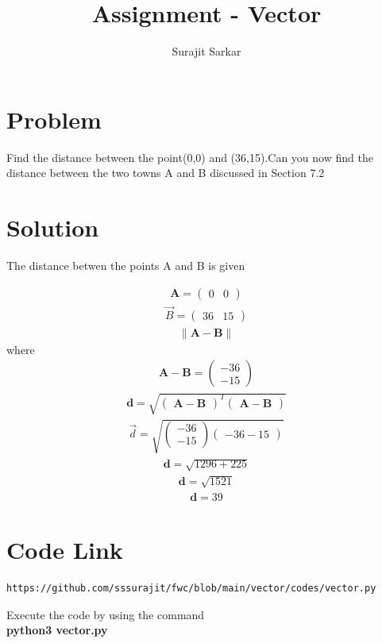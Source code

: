 \documentclass[journal,12pt,twocolumn]{IEEEtran}
\title{\mytitle}
\title{
Assignment - Vector
}
\author{Surajit Sarkar}
\newcommand{\myvec}[1]{\ensuremath{\begin{pmatrix}#1\end{pmatrix}}}
\providecommand{\norm}[1]{\lVert#1\rVert}
\let\vec\mathbf
\begin{document}
\maketitle
\tableofcontents
\bigskip
\section{\textbf{Problem}}
Find the distance between the point(0,0) and (36,15).Can you now find the distance between the two towns A and B discussed in Section 7.2
\section{\textbf{Solution}}
The distance betwen the points A and B is given


\begin{align*}
       \vec A=\myvec{0 & 0}
\end{align*}   
\begin{align*}
       \Vec B=\myvec{36 & 15}
 \end{align*}
 \begin{align*}
     \norm{\vec{A}-\vec{B}}
 \end{align*}
       where 
 \begin{align*}
     \vec{A}-\vec{B}=\myvec{-36\\-15}
 \end{align*}      
\begin{align*}
    \vec d=\sqrt{\myvec{\vec{A}-\vec{B}}^T\myvec{\vec{A}-\vec{B}}}
\end{align*}
\begin{align*}
    \Vec d =\sqrt{\myvec{-36\\-15}{\myvec{-36-15}}}
\end{align*}
\begin{align*}
    \vec d=\sqrt{1296+225}
\end{align*}
\begin{align*}
    \vec d=\sqrt{1521}
\end{align*}
\begin{align*}
    \vec d=39
\end{align*}
\section{\textbf{Code Link}}
\begin{lstlisting}
https://github.com/sssurajit/fwc/blob/main/vector/codes/vector.py
\end{lstlisting}
Execute the code by using the command\\
\textbf{python3 vector.py}
\end{document}

